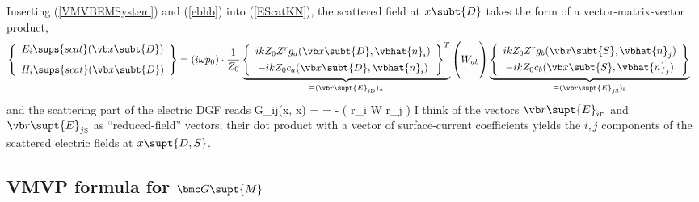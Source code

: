 \documentclass[letterpaper]{article}
\newcommand{\iD}{_{i\text{\tiny D}}}
\newcommand{\jS}{_{j\text{\tiny S}}}
\begin{document}
Inserting (\ref{VMVBEMSystem}) and (\ref{ebhb}) into
(\ref{EScatKN}), the scattered field at $x\subt{D}$
takes the form of a vector-matrix-vector product,
\begin{align}
  \left\{\begin{array}{c}
 E_i\sups{scat}(\vb x\subt{D}) \\[8pt]
 H_i\sups{scat}(\vb x\subt{D})
 \end{array}\right\}
&=(i\omega p_0) \cdot \frac{1}{Z_0}
  \underbrace{
  \left\{\begin{array}{c}
     ikZ_0 Z^r
     g_a(\vb x\subt{D}, \vbhat{n}_i) \\[4pt]
    -ikZ_0 c_a(\vb x\subt{D}, \vbhat{n}_i) 
  \end{array}\right\}^T
             }_{\equiv (\vb r\supt{E}\iD)_a}
  \left(
 \vphantom{
  \left\{\begin{array}{c} 
    ik Z_0 Z^r
     g_a(\vb x\subt{D}, \vbhat{n}_i) \\[4pt]
    -ikZ_0 c_a(\vb x\subt{D}, \vbhat{n}_i) 
  \end{array}\right\}^T
          }
         W_{ab}
  \right)
  \underbrace{
  \left\{\begin{array}{c} 
    ikZ_0 Z^r g_b(\vb x\subt{S}, \vbhat{n}_j) \\[4pt]
    -ik Z_0 c_b(\vb x\subt{S}, \vbhat{n}_j) 
  \end{array}\right\}
             }_{\equiv (\vb r\supt{E}\jS)_b}
\label{GEVMVP}
\end{align}
and the scattering part of the electric DGF reads
{
 \mc G_{ij}(\vb x, \vb x)
= 
= -
   \Big( \vb r\iD{} \cdot \vb W \cdot \vb r\jS{} \Big)
}
I think of the vectors $\vb r\supt{E}\iD$ and $\vb r\supt{E}\jS$ 
as ``reduced-field'' vectors; their dot product with a vector
of surface-current coefficients yields the $i,j$ components of 
the scattered electric fields at $x\supt{D,S}$.

\subsection*{VMVP formula for $\bmc G\supt{M}$}
\end{document}
